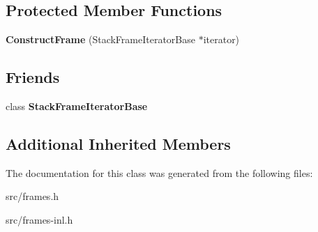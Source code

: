 \subsection*{Protected Member Functions}
\begin{DoxyCompactItemize}
\item 
\hypertarget{classv8_1_1internal_1_1_construct_frame_ac4c5d9185272361659321552533290c2}{}{\bfseries Construct\+Frame} (Stack\+Frame\+Iterator\+Base $\ast$iterator)\label{classv8_1_1internal_1_1_construct_frame_ac4c5d9185272361659321552533290c2}

\end{DoxyCompactItemize}
\subsection*{Friends}
\begin{DoxyCompactItemize}
\item 
\hypertarget{classv8_1_1internal_1_1_construct_frame_ac7310421866976ca454bbe11c5f926c3}{}class {\bfseries Stack\+Frame\+Iterator\+Base}\label{classv8_1_1internal_1_1_construct_frame_ac7310421866976ca454bbe11c5f926c3}

\end{DoxyCompactItemize}
\subsection*{Additional Inherited Members}


The documentation for this class was generated from the following files\+:\begin{DoxyCompactItemize}
\item 
src/frames.\+h\item 
src/frames-\/inl.\+h\end{DoxyCompactItemize}
